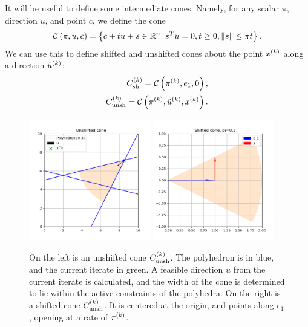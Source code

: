 % 

It will be useful to define some intermediate cones.
Namely, for any scalar $\pi$, direction $u$, and point $c$, we define the cone
\begin{align}
\mathcal C\left(\pi, u, c\right) = \left\{c + t u + s \in \mathbb R^n | \; s^Tu= 0, t \ge 0, \|s\| \le \pi t\right\}.
\end{align}
We can use this to define shifted and unshifted cones about the point $x^{(k)}$ along a direction ${{{\hat u}^{(k)}}}$:
\begin{align}
{C^{(k)}_{\textrm{sh}}} = \mathcal C\left(\pi^{(k)}, e_1, 0\right), \label{defineshiftedcone} \\
{C^{(k)}_{\textrm{unsh}}} = \mathcal C\left(\pi^{(k)}, {{{\hat u}^{(k)}}}, x^{(k)}\right). \label{defineunshiftedcone}
\end{align}


\begin{figure}[ht]
    \centering
    \includegraphics[width=200px]{images/unshifted_cone.png}
    \includegraphics[width=200px]{images/shifted_cone.png}
    \caption[An example of the shifted and unshifted cones]
	{
		On the left is an unshifted cone ${C^{(k)}_{\textrm{unsh}}}$.
		The polyhedron is in blue, and the current iterate in green.
		A feasible direction $u$ from the current iterate is calculated, and the width of the cone is determined to lie within the active constraints of the polyhedra.
		On the right is a shifted cone ${C^{(k)}_{\textrm{unsh}}}$.
		It is centered at the origin, and points along $e_1$, opening at a rate of $\pi^{(k)}$.
    }
    \label{linear_cones_images}
\end{figure}


